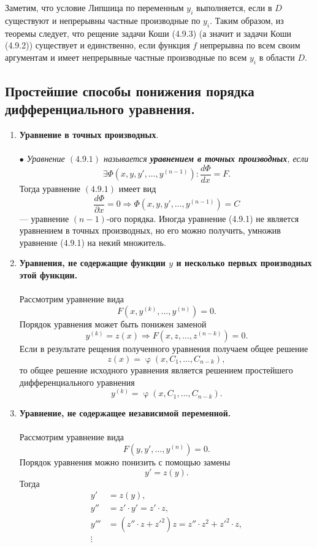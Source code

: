 \documentclass[a4paper, 12pt]{report}
\newcommand{\FI}{\Phi}
\renewcommand{\varphi}{\upvarphi}
\renewcommand{\d}{\partial}
\begin{document}
Заметим, что условие Липшица по переменным $y_i$ выполняется, если в $D$ существуют и непрерывны частные производные по $y_i$. Таким образом, из теоремы следует, что рещение задачи Коши (4.9.3) (а значит и задачи Коши (4.9.2)) существует и единственно, если функция $f$ непрерывна по всем своим аргументам и имеет непрерывные частные производные по всем $y_i$ в области $D$.
\subsection{Простейшие способы понижения порядка дифференциального уравнения.}
\begin{enumerate}
	\item \textbf{Уравнение в точных производных}.\\\\
	$\bullet$ \textit{Уравнение $(4.9.1)$ называется \textbf{уравнением в точных производных}, если $$\exists \FI(x,y,y',\ldots, y^{(n-1)}) : \dfrac{d \FI}{d x} = F.$$}
	Тогда уравнение $(4.9.1)$ имеет вид $$\dfrac{d \FI}{\d x}= 0 \Rightarrow \FI(x,y,y', \ldots, y^{(n-1)}) = C$$
	--- уравнение $(n-1)$-ого порядка.
	Иногда уравнение (4.9.1) не является уравнением в точных производных, но его можно получить, умножив уравнение (4.9.1) на некий множитель.
	\item \textbf{Уравнения, не содержащие функции $y$ и несколько первых производных этой функции.}\\\\
	Рассмотрим уравнение вида $$F(x,y^{(k)}, \ldots, y^{(n)}) = 0.$$
	Порядок уравнения может быть понижен заменой $$y^{(k)} = z(x) \Rightarrow F(x, z, \ldots, z^{(n-k)}) = 0.$$
	Если в результате рещения полученного уравнения получаем общее решение $$z(x) = \varphi(x, C_1, \ldots, C_{n-k}),$$
	 то общее решение исходного уравнения является решением простейшего дифференциального уравнения $$y^{(k)} = \varphi(x, C_1, \ldots, C_{n-k}).$$
	 \item \textbf{Уравнение, не содержащее независимой переменной.}\\\\Рассмотрим уравнение вида $$F(y,y',\ldots, y^{(n)}) = 0.$$
	 Порядок уравнения можно понизить с помощью замены $$y' = z(y).$$
	 Тогда  $$\begin{aligned}
	 	y' &= z(y),\\
	 	y'' &= z'\cdot y' = z'\cdot z,\\
	 	y''' &= (z''\cdot z + z'^2)z = z''\cdot z^2 + z'^2 \cdot z,\\
	 	\vdots
	 \end{aligned}$$

\end{enumerate}
\end{document}
